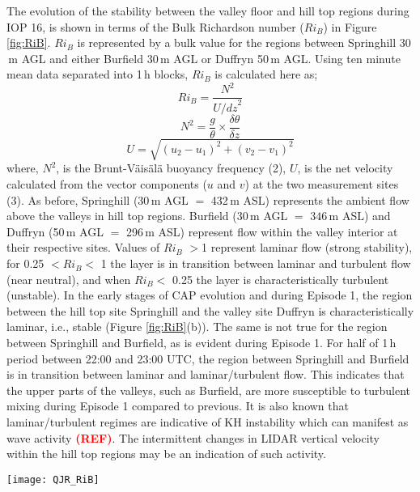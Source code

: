 \documentclass[times]{qjrms4}
\begin{document}
The evolution of the stability between the valley floor and hill top regions during IOP 16, is shown in terms of the Bulk Richardson number ($Ri_B$) in Figure \ref{fig:RiB}. $Ri_B$ is represented by a bulk value for the regions between Springhill 30$\,\mbox{m}$ AGL and either Burfield 30$\,\mbox{m}$ AGL or Duffryn 50$\,\mbox{m}$ AGL. Using ten minute mean data separated into 1$\,\mbox{h}$ blocks, $Ri_B$ is calculated here as;
        \begin{equation}    \label{eq:Rib1}
        Ri_B = \frac{N^2}{{U/dz}^2}
        \end{equation}
        \begin{equation}    \label{eq:Rib1}
        N^2 = \frac{g}{\theta}\times\frac{\delta\theta}{\delta z}
        \end{equation}
        \begin{equation}    \label{eq:Rib1}
        U = \sqrt{(u_2-u_1)^2+(v_2-v_1)^2}
        \end{equation}
\noindent where, $N^2$, is the Brunt-V\"ais\"al\"a buoyancy frequency (2), $U$, is the net velocity calculated from the vector components ($u$ and $v$) at the two measurement sites (3). As before, Springhill (30$\,\mbox{m}$ AGL $=$ 432$\,\mbox{m}$ ASL) represents the ambient flow above the valleys in hill top regions. Burfield (30$\,\mbox{m}$ AGL $=$ $346\,\mbox{m}$ ASL) and Duffryn (50$\,\mbox{m}$ AGL $=$ 296$\,\mbox{m}$ ASL) represent flow within the valley interior at their respective sites. Values of $Ri_B$ $>$1 represent laminar flow (strong stability), for 0.25 $< Ri_B <$ 1 the layer is in transition between laminar and turbulent flow (near neutral), and when $Ri_B <$ 0.25 the layer is characteristically turbulent (unstable). In the early stages of CAP evolution and during Episode 1, the region between the hill top site Springhill and the valley site Duffryn is characteristically laminar, i.e., stable (Figure \ref{fig:RiB}(b)). The same is not true for the region between Springhill and Burfield, as is evident during Episode 1. For half of 1$\,\mbox{h}$ period between 22:00 and 23:00 UTC, the region between Springhill and Burfield is in transition between laminar and laminar/turbulent flow. This indicates that the upper parts of the valleys, such as Burfield, are more susceptible to turbulent mixing during Episode 1 compared to previous. It is also known that laminar/turbulent regimes are indicative of KH instability which can manifest as wave activity \textcolor{red}{\bf(REF)}. The intermittent changes in LIDAR vertical velocity within the hill top regions may be an indication of such activity.
       \begin{figure*}
        \centering
        \texttt{[image: QJR\_RiB]}
        \caption{Bulk Richardson number ($Ri_B$) representing the regions between Springhill 30$\,\mbox{m}$ AGL and; (a) Burfield 30$\,\mbox{m}$ AGL, (b) Duffryn 50$\,\mbox{m}$ AGL.}
        \label{fig:RiB}
        \end{figure*}
\end{document}
